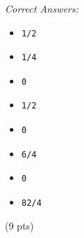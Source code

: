 \documentclass[10pt,dvips]{amsart}
\begin{document}
\par{\small{\it Correct Answers:}
\vspace{-\parskip}\begin{itemize}
\item\begin{verbatim}1/2\end{verbatim}
\item\begin{verbatim}1/4\end{verbatim}
\item\begin{verbatim}0\end{verbatim}
\item\begin{verbatim}1/2\end{verbatim}
\item\begin{verbatim}0\end{verbatim}
\item\begin{verbatim}6/4\end{verbatim}
\item\begin{verbatim}0\end{verbatim}
\item\begin{verbatim}82/4\end{verbatim}
\end{itemize}}\par
% 
% 


 (9 pts) \ifdim\lastskip=\pgmlMarker
  \let\pgmlPar=\relax
 \else
  \let\pgmlPar=\par
  \vadjust{\kern3pt}%
\fi
\end{document}
